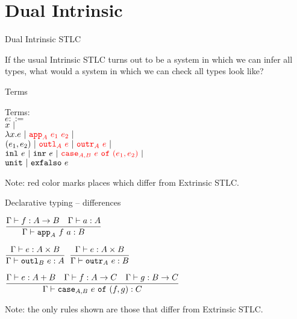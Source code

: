\documentclass{beamer}
\begin{document}
\section{Dual Intrinsic}


\begin{frame}{Dual Intrinsic STLC}

If the usual Intrinsic STLC turns out to be a system in which we can infer all types, what would a system in which we can check all types look like?

\end{frame}

\begin{frame}{Terms}

Terms: \\
$e ::=$ \\
\qquad $x \ |\ $ \\
\qquad $\fun{x}{e} \pipe \termdiff{\iapp{A}{e_1}{e_2}} \pipe$ \\
\qquad $\pair{e_1}{e_2} \pipe \termdiff{\ioutl{A}{e}} \pipe \termdiff{\ioutr{A}{e}} \pipe$ \\
\qquad $\inl{e} \pipe \inr{e} \pipe \termdiff{\icase{A}{B}{e}{e_1}{e_2}} \pipe$ \\
\qquad $\texttt{unit} \ |\  \texttt{exfalso}\ e$

\vspace{2em}

Note: red color marks places which differ from Extrinsic STLC.

\end{frame}

\begin{frame}{Declarative typing -- differences}

\begin{center}
  $\displaystyle \frac{\Gamma \vdash f : A \to B \quad \Gamma \vdash a : A}{\Gamma \vdash \texttt{app}_{A}\ f\ a : B} \textsc{\footnotesize{}}$

  \vspace{2em}

  $\displaystyle \frac{\Gamma \vdash e : A \times B}{\Gamma \vdash \texttt{outl}_{B}\ e : A} \textsc{\footnotesize{}}$ \quad
  $\displaystyle \frac{\Gamma \vdash e : A \times B}{\Gamma \vdash \texttt{outr}_{A}\ e : B} \textsc{\footnotesize{}}$ \quad

  \vspace{2em}

  $\displaystyle \frac{\Gamma \vdash e : A + B \quad \Gamma \vdash f : A \to C \quad \Gamma \vdash g : B \to C}{\Gamma \vdash \texttt{case}_{A, B}\ e\ \texttt{of}\ (f, g) : C} \textsc{\footnotesize{}}$
\end{center}

\vspace{2em}

Note: the only rules shown are those that differ from Extrinsic STLC.

\end{frame}
\end{document}

